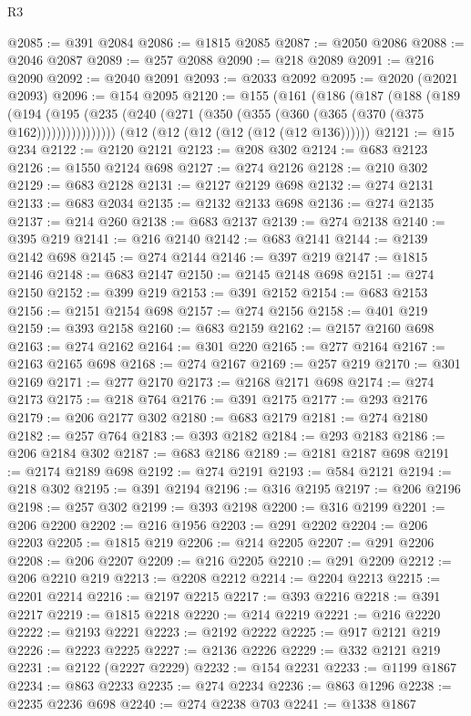 \begin{lexlean}{R3}
\begin{coremodule}
@2085 := @391 @2084
@2086 := @1815 @2085
@2087 := @2050 @2086
@2088 := @2046 @2087
@2089 := @257 @2088
@2090 := @218 @2089
@2091 := @216 @2090
@2092 := @2040 @2091
@2093 := @2033 @2092
@2095 := @2020 (@2021 @2093)
@2096 := @154 @2095
@2120 := @155
    (@161
      (@186
        (@187
          (@188
            (@189
              (@194 (@195 (@235 (@240 (@271 (@350 (@355 (@360 (@365 (@370 (@375 @162))))))))))))))))
    (@12 (@12 (@12 (@12 (@12 (@12 @136))))))
@2121 := @15 @234
@2122 := @2120 @2121
@2123 := @208 @302
@2124 := @683 @2123
@2126 := @1550 @2124 @698
@2127 := @274 @2126
@2128 := @210 @302
@2129 := @683 @2128
@2131 := @2127 @2129 @698
@2132 := @274 @2131
@2133 := @683 @2034
@2135 := @2132 @2133 @698
@2136 := @274 @2135
@2137 := @214 @260
@2138 := @683 @2137
@2139 := @274 @2138
@2140 := @395 @219
@2141 := @216 @2140
@2142 := @683 @2141
@2144 := @2139 @2142 @698
@2145 := @274 @2144
@2146 := @397 @219
@2147 := @1815 @2146
@2148 := @683 @2147
@2150 := @2145 @2148 @698
@2151 := @274 @2150
@2152 := @399 @219
@2153 := @391 @2152
@2154 := @683 @2153
@2156 := @2151 @2154 @698
@2157 := @274 @2156
@2158 := @401 @219
@2159 := @393 @2158
@2160 := @683 @2159
@2162 := @2157 @2160 @698
@2163 := @274 @2162
@2164 := @301 @220
@2165 := @277 @2164
@2167 := @2163 @2165 @698
@2168 := @274 @2167
@2169 := @257 @219
@2170 := @301 @2169
@2171 := @277 @2170
@2173 := @2168 @2171 @698
@2174 := @274 @2173
@2175 := @218 @764
@2176 := @391 @2175
@2177 := @293 @2176
@2179 := @206 @2177 @302
@2180 := @683 @2179
@2181 := @274 @2180
@2182 := @257 @764
@2183 := @393 @2182
@2184 := @293 @2183
@2186 := @206 @2184 @302
@2187 := @683 @2186
@2189 := @2181 @2187 @698
@2191 := @2174 @2189 @698
@2192 := @274 @2191
@2193 := @584 @2121
@2194 := @218 @302
@2195 := @391 @2194
@2196 := @316 @2195
@2197 := @206 @2196
@2198 := @257 @302
@2199 := @393 @2198
@2200 := @316 @2199
@2201 := @206 @2200
@2202 := @216 @1956
@2203 := @291 @2202
@2204 := @206 @2203
@2205 := @1815 @219
@2206 := @214 @2205
@2207 := @291 @2206
@2208 := @206 @2207
@2209 := @216 @2205
@2210 := @291 @2209
@2212 := @206 @2210 @219
@2213 := @2208 @2212
@2214 := @2204 @2213
@2215 := @2201 @2214
@2216 := @2197 @2215
@2217 := @393 @2216
@2218 := @391 @2217
@2219 := @1815 @2218
@2220 := @214 @2219
@2221 := @216 @2220
@2222 := @2193 @2221
@2223 := @2192 @2222
@2225 := @917 @2121 @219
@2226 := @2223 @2225
@2227 := @2136 @2226
@2229 := @332 @2121 @219
@2231 := @2122 (@2227 @2229)
@2232 := @154 @2231
@2233 := @1199 @1867
@2234 := @863 @2233
@2235 := @274 @2234
@2236 := @863 @1296
@2238 := @2235 @2236 @698
@2240 := @274 @2238 @703
@2241 := @1338 @1867

\end{coremodule}
\end{lexlean}
